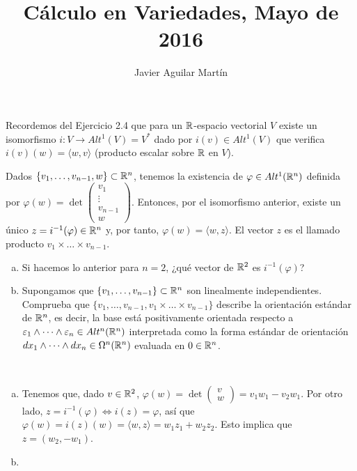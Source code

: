 \documentclass[twoside]{article}
\begin{document}
\title{Cálculo en Variedades, Mayo de 2016}
\author{Javier Aguilar Martín}
\maketitle


\begin{ejercicio}{1}
Recordemos del Ejercicio 2.4 que para un $\mathbb{R}$-espacio vectorial $V$ existe un isomorfismo $i:V\to Alt^1(V)=V^*$ dado por $i(v)\in Alt^1(V)$ que verifica $i(v)(w)=\langle w, v\rangle$ (producto escalar sobre $\mathbb{R}$ en $V$). 

Dados $\{v_1,\dots, v_{n-1},w\}\subset\mathbb{R}^n$, tenemos la existencia de $\varphi\in Alt^1(\mathbb{R}^n)$ definida por $\varphi(w)=\det\begin{pmatrix}
v_1\\
\vdots\\
v_{n-1}\\
w
\end{pmatrix}$. Entonces, por el isomorfismo anterior, existe un único $z=i^{-1}(\varphi)\in\mathbb{R}^n$ y, por tanto, $\varphi(w)=\langle w,z\rangle$. El vector $z$ es el llamado producto $v_1\times\dots\times v_{n-1}$.
\begin{enumerate}[a)]
\item Si hacemos lo anterior para $n=2$, ¿qué vector de $\mathbb{R}^2$ es $i^{-1}(\varphi)$?
\item Supongamos que $\{v_1,\dots, v_{n-1}\}\subset\mathbb{R}^n$ son linealmente independientes. Comprueba que $\{v_1,\dots, v_{n-1}, v_1\times\dots\times v_{n-1}\}$ describe la orientación estándar de $\mathbb{R}^n$, es decir, la base está positivamente orientada respecto a $\varepsilon_1\land\dots\land\varepsilon_n\in Alt^n(\mathbb{R}^n)$ interpretada como la forma estándar de orientación $dx_1\land\dots\land dx_n\in\Omega^n(\mathbb{R}^n)$ evaluada en $0\in\mathbb{R}^n$.
\end{enumerate}
\end{ejercicio}
\begin{solucion}\
\begin{enumerate}[a)]
\item  Tenemos que, dado $v\in\mathbb{R}^2$,  $\varphi(w)=\det\begin{pmatrix}
v\\
w
\end{pmatrix}=v_1w_1-v_2w_1$. Por otro lado, $z=i^{-1}(\varphi)\Leftrightarrow i(z)=\varphi$, así que $\varphi(w)=i(z)(w)=\langle w,z\rangle =w_1z_1+w_2z_2$. Esto implica que $z=(w_2,-w_1)$. 
\item
\end{enumerate}

\end{solucion}
\end{document}
